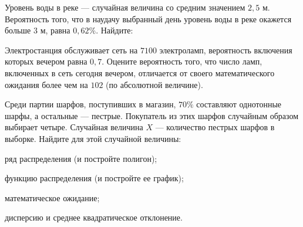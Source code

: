 \vfil

\begin{zkrPlain}{25}\noindent 
	Уровень воды в реке — случайная величина со средним значением $2{,}5$ м. Вероятность того, что в наудачу выбранный день уровень воды в реке окажется больше $3$ м, равна $0{,}62\%$. Найдите: \par {}
 
\end{zkrPlain}

\vfil

\begin{zkrPlain}{25}\noindent 
	Электростанция обслуживает сеть на $ 7100 $ электроламп, вероятность включения которых вечером равна $ 0{,}7 $. Оцените вероятность того, что число ламп, включенных в сеть сегодня вечером, отличается от своего математического ожидания более чем на $ 102 $ (по абсолютной величине). 
 
\end{zkrPlain}

\newpage\setcounter{zad}{0}\setcounter{footnote}{0}



\begin{zkrPlain}{25}\noindent 
	Среди партии шарфов, поступивших в магазин, $70 \%$ составляют однотонные шарфы, а остальные --- пестрые. Покупатель из этих шарфов случайным образом выбирает четыре. Случайная величина $X$ --- количество пестрых шарфов в выборке.  Найдите для этой случайной величины: \par \smallskip\small{ \par \zz ряд распределения (и постройте полигон); \par \zz функцию распределения (и постройте ее график); \par \zz математическое ожидание; \par \zz дисперсию и среднее квадратическое отклонение.\par \par}
 
\end{zkrPlain}

\vfil

